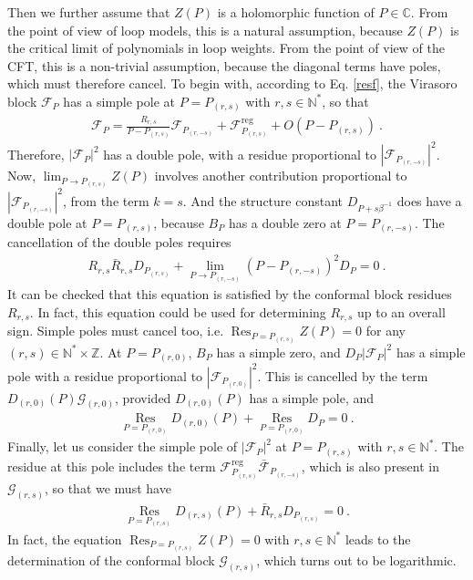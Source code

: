 \documentclass[12pt, a4paper]{article}
\theoremstyle{break}
\begin{document}
Then we further assume that $Z(P)$ is a holomorphic function of $P\in\mathbb{C}$. From the point of view of loop models, this is a natural assumption, because $Z(P)$ is the critical limit of polynomials in loop weights. From the point of view of the CFT, this is a non-trivial assumption, because the diagonal terms have poles, which must therefore cancel. 
To begin with, according to Eq. \eqref{resf}, the Virasoro block $\mathcal{F}_P$ has a simple pole at $P=P_{(r,s)}$ with $r,s\in \mathbb{N}^*$, so that 
\begin{align}
 \mathcal{F}_P = \frac{R_{r,s}}{P-P_{(r,s)}} \mathcal{F}_{P_{(r,-s)}} + \mathcal{F}^\text{reg}_{P_{(r,s)}} + O(P-P_{(r,s)}) \ . 
 \label{freg}
\end{align}
Therefore, $\left|\mathcal{F}_P\right|^2$ has a double pole, with a residue proportional to $\left|\mathcal{F}_{P_{(r,-s)}}\right|^2$. Now, $\lim_{P\to P_{(r,s)}} Z(P)$ involves another contribution proportional to $\left|\mathcal{F}_{P_{(r,-s)}}\right|^2$, from the term $k=s$. And the structure constant $D_{P+s\beta^{-1}}$ does have a double pole at $P=P_{(r,s)}$, because $B_P$ has a double zero at $P=P_{(r,-s)}$. The cancellation of the double poles requires 
\begin{align}
 R_{r,s}\bar{R}_{r,s}D_{P_{(r,s)}} + \lim_{P\to P_{(r,-s)}}\left(P-P_{(r,-s)}\right)^2 D_P = 0 \ .
 \label{dpld}
\end{align}
It can be checked that this equation is satisfied by the conformal block residues $R_{r,s}$. In fact, this equation could be used for determining $R_{r,s}$ up to an overall sign. 
Simple poles must cancel too, i.e. $\operatorname{Res}_{P=P_{(r,s)}}Z(P)=0$ for any $(r,s)\in \mathbb{N}^*\times\mathbb{Z}$. At $P=P_{(r,0)}$, $B_P$ has a simple zero, and $D_P\left|\mathcal{F}_P\right|^2$ has a simple pole with a residue proportional to $\left|\mathcal{F}_{P_{(r,0)}}\right|^2$. This is  cancelled by the term $D_{(r,0)}(P) \mathcal{G}_{(r,0)}$, provided $D_{(r,0)}(P)$ has a simple pole, and 
\begin{align}
  \underset{P=P_{(r,0)}}{\operatorname{Res}} D_{(r,0)}(P) + \underset{P=P_{(r,0)}}{\operatorname{Res}}D_P = 0 \ .
\end{align}
Finally, let us consider the simple pole of $\left|\mathcal{F}_{P}\right|^2$ at $P=P_{(r,s)}$ with $r,s\in \mathbb{N}^*$. The residue at this pole includes the term 
$\mathcal{F}_{P_{(r,s)}}^\text{reg}\bar{\mathcal{F}}_{P_{(r,-s)}}$, which is also present in $\mathcal{G}_{(r,s)}$, so that we must have 
\begin{align}
 \underset{P=P_{(r,s)}}{\operatorname{Res}} D_{(r,s)}(P) + \bar R_{r,s} D_{P_{(r,s)}} = 0\ .
 \label{rdp}
\end{align}
In fact, the equation $\operatorname{Res}_{P=P_{(r,s)}}Z(P)=0$ with $r,s\in \mathbb{N}^*$ leads to the determination of the conformal block $\mathcal{G}_{(r,s)}$, which turns out to be logarithmic. 
\end{document}
